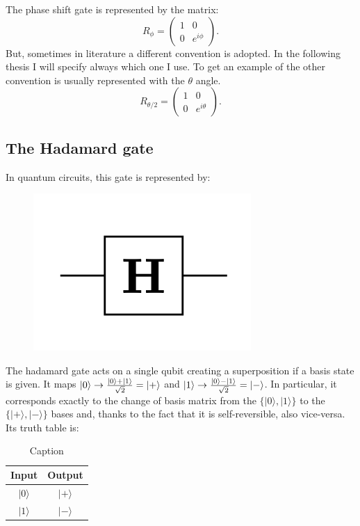 The phase shift gate is represented by the matrix:
\begin{equation*}
     R_{\phi}=  \left(\begin{array}{cc}
1 & 0 \\
0 & e^{i\phi}
\end{array}\right)  .
\end{equation*}
But, sometimes in literature a different convention is adopted. In the following thesis I will specify always which one I use. 
To get an example of the other convention 
is usually represented with the $\theta$ angle.
\begin{equation*}
     R_{\theta / 2}=  \left(\begin{array}{cc}
1 & 0 \\
0 & e^{i\theta}
\end{array}\right)  .
\end{equation*}



\subsection*{The Hadamard gate}
In quantum circuits, this gate is represented by:
\begin{figure}[H]
\centering
\includegraphics{Mainmatter/images/Hadamard_GAte.png}
\end{figure}
The hadamard gate acts on a single qubit creating a superposition if a basis state is given. It maps $\ket{0} \to \frac{\ket{0} + \ket{1}}{\sqrt{2}} = \ket{+}$  and  $\ket{1} \to \frac{\ket{0} - \ket{1}}{\sqrt{2}} = \ket{-}$. 
In particular, it corresponds exactly to the change of basis matrix from the $\{|0\rangle,|1\rangle\}$ to the $\{|+\rangle,|-\rangle\}$ bases and, thanks to the fact that it is self-reversible, also vice-versa. Its truth table is: 
\begin{table}[h!]
    \centering
    \begin{tabular}{cc}
\hline Input & Output \\
\hline$|0\rangle$ & $|+\rangle$ \\
$|1\rangle$ & $|-\rangle$ \\
\hline
\end{tabular}
    \caption{Caption}
    \label{tab:my_label}
\end{table}

